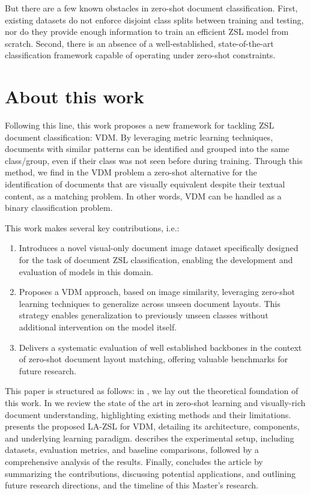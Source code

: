 But there are a few known obstacles in zero-shot document classification. First, existing datasets do not enforce disjoint class splits between training and testing, nor do they provide enough information to train an efficient \gls{ZSL} model from scratch. Second, there is an absence of a well-established, state-of-the-art classification framework capable of operating under zero-shot constraints.

\section{About this work}

Following this line, this work proposes a new framework for tackling \gls{ZSL} document classification: \gls{VDM}. By leveraging metric learning techniques, documents with similar patterns can be identified and grouped into the same class/group, even if their class was not seen before during training. Through this method, we find in the \gls{VDM} problem a zero-shot alternative for the identification of documents that are visually equivalent despite their textual content, as a matching problem. In other words, \gls{VDM} can be handled as a binary classification problem.

This work makes several key contributions, i.e.:
\begin{enumerate}
    \item Introduces a novel visual-only document image dataset specifically designed for the task of document ZSL classification, enabling the development and evaluation of models in this domain.
    \item Proposes a \gls{VDM} approach, based on image similarity, leveraging zero-shot learning techniques to generalize across unseen document layouts. This strategy enables generalization to previously unseen classes without additional intervention on the model itself.
    \item Delivers a systematic evaluation of well established backbones in the context of zero-shot document layout matching, offering valuable benchmarks for future research.
\end{enumerate}

This paper is structured as follows: in , we lay out the theoretical foundation of this work. In  we review the state of the art in zero-shot learning and visually-rich document understanding, highlighting existing methods and their limitations.  presents the proposed \gls{LA-ZSL} for \gls{VDM}, detailing its architecture, components, and underlying learning paradigm.  describes the experimental setup, including datasets, evaluation metrics, and baseline comparisons, followed by a comprehensive analysis of the results. Finally,  concludes the article by summarizing the contributions, discussing potential applications, and outlining future research directions, and the timeline of this Master's research.


